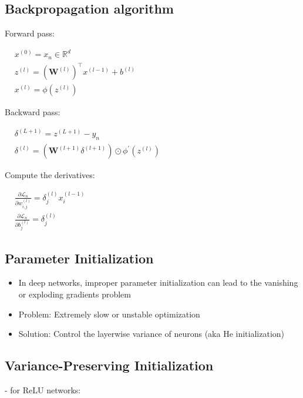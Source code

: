 \subsection*{Backpropagation algorithm}
Forward pass:

$
\begin{aligned}
& x^{(0)}=x_{n} \in \mathbb{R}^{d} \\
& z^{(l)}=\left(\mathbf{W}^{(l)}\right)^{\top} x^{(l-1)}+b^{(l)} \\
& x^{(l)}=\phi\left(z^{(l)}\right)
\end{aligned}
$

Backward pass:

$
\begin{aligned}
& \delta^{(L+1)}=z^{(L+1)}-y_{n} \\
& \delta^{(l)}=\left(\mathbf{W}^{(l+1)} \delta^{(l+1)}\right) \odot \phi^{\prime}\left(z^{(l)}\right)
\end{aligned}
$



Compute the derivatives:

$
\begin{aligned}
& \frac{\partial \mathscr{L}_{n}}{\partial w_{i, j}^{(l)}}=\delta_{j}^{(l)} x_{i}^{(l-1)} \\
& \frac{\partial \mathscr{L}_{n}}{\partial b_{j}^{(l)}}=\delta_{j}^{(l)}
\end{aligned}
$

\subsection*{Parameter Initialization}
\begin{itemize}
  \item In deep networks, improper parameter initialization can lead to the vanishing or exploding gradients problem

  \item Problem: Extremely slow or unstable optimization

  \item Solution: Control the layerwise variance of neurons (aka He initialization)

\end{itemize}

\subsection*{Variance-Preserving Initialization}
- for ReLU networks:

